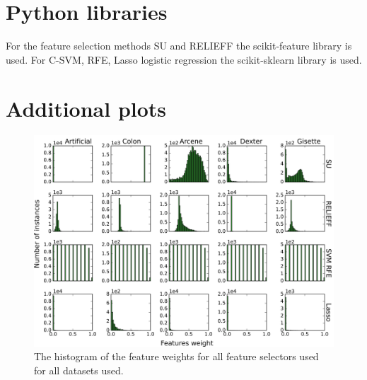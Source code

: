 \documentclass[twoside,11pt]{article}
\begin{document}
\vskip 0.2in


\newpage

\appendix
\label{appendix}
\section{Python libraries}
\label{apd:libraries}
For the feature selection methods SU and RELIEFF the scikit-feature library \citep{Li-etal16} is used.
For C-SVM, RFE, Lasso logistic regression the scikit-sklearn library \citep{scikit-learn} is used.
\section{Additional plots}
\label{apd:plots}
\begin{figure}[h!]
  \centering
    \includegraphics[width=\textwidth]{images/feature_weights_hist.png}
  \caption{The histogram of the feature weights for all feature selectors used for all datasets used.}
  \label{fig:feature_weights_hist}
\end{figure}
\end{document}
